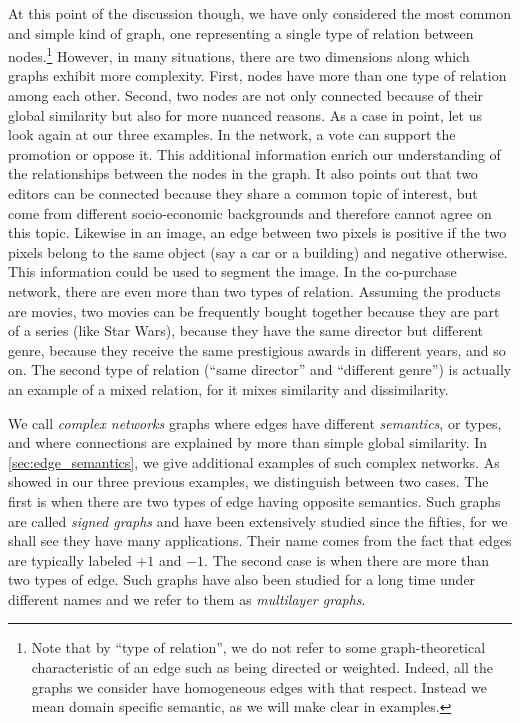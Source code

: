 At this point of the discussion though, we have only considered the most common and simple kind of
graph, one representing a single type of relation between nodes.\footnote{Note that by \enquote{type
of relation}, we do not refer to some graph-theoretical characteristic of an edge such as being directed or weighted.
Indeed, all the graphs we consider have homogeneous edges with that respect. Instead we mean domain
specific semantic, as we will make clear in examples.} However, in many situations, there
are two dimensions along which graphs exhibit more complexity. First, nodes have more than one type
of relation among each other. Second, two nodes are not only connected because of their global
similarity but also for more nuanced reasons. As a case in point, let us look again at our
three examples. In the \wik{} network, a vote can support the promotion or oppose it. This
additional information enrich our understanding of the relationships between the nodes in the graph.
It also points out that two editors can be connected because they share a common topic of interest,
but come from different socio-economic backgrounds and therefore cannot agree on this topic.
Likewise in an image, an edge between two pixels is positive if the two pixels belong to the same
object (say a car or a building) and negative otherwise. This information could be used to segment
the image. In the co-purchase network, there are even more than two types of relation. Assuming the
products are movies, two movies can be frequently bought together because they are part of a series
(like Star Wars), because they have the same director but different genre, because they receive the
same prestigious awards in different years, and so on. The second type of relation (\enquote{same
director} and \enquote{different genre}) is actually an example of a mixed relation, for it mixes
similarity and dissimilarity.

We call \emph{complex networks} graphs where edges have different \emph{semantics}, or types, and
where connections are explained by more than simple global similarity. In
\autoref{sec:edge_semantics}, we give additional examples of such complex networks. As
showed in our three previous examples, we distinguish between two cases. The first is when there are two types of
edge having opposite semantics. Such graphs are called \emph{signed graphs} and have been
extensively studied since the fifties, for we shall see they have many applications. Their name
comes from the fact that edges are typically labeled $+1$ and $-1$. The second case
is when there are more than two types of edge. Such graphs have also been studied for a long time
under different names and we refer to them as \emph{multilayer graphs}.

